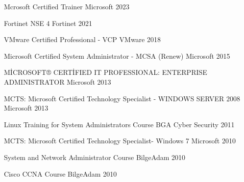 

\begin{cvhonors}

  \cvhonor
    {Mcrosoft Certified Trainer} %
    {Microsoft} %
    {} %
    {2023} %

  \cvhonor
    {Fortinet NSE 4} %
    {Fortinet} %
    {} %
    {2021} %

  \cvhonor
    {VMware Certified Professional - VCP} %
    {VMware} %
    {} %
    {2018} %

  \cvhonor
    {Microsoft Certified System Administrator - MCSA (Renew) } %
    {Microsoft} %
    {} %
    {2015} %

  \cvhonor
    {MİCROSOFT® CERTİFIED IT PROFESSIONAL: ENTERPRISE ADMINISTRATOR } %
    {Microsoft} %
    {} %
    {2013} %


  \cvhonor
    {MCTS: Microsoft Certified Technology Specialist - WINDOWS SERVER 2008 } %
    {Microsoft} %
    {} %
    {2013} %

 
  \cvhonor
    {Linux Training for System Administrators Course} %
    {BGA Cyber Security} %
    {} %
    {2011} %


   \cvhonor
    {MCTS: Microsoft Certified Technology Specialist- Windows 7} %
    {Microsoft} %
    {} %
    {2010} %


  \cvhonor
    {System and Network Administrator Course} %
    {BilgeAdam} %
    {} %
    {2010} %


\cvhonor
    {Cisco CCNA Course} %
    {BilgeAdam} %
    {} %
    {2010} %


\end{cvhonors}
